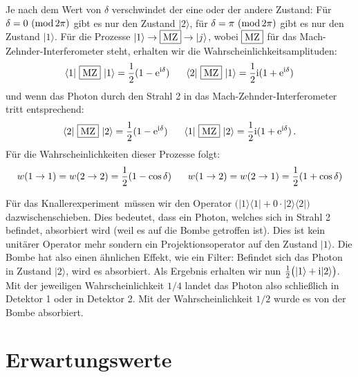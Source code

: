 Je nach dem Wert von $\delta$ verschwindet der eine oder der andere Zustand: F\"ur $\delta=0~({\rm mod}\, 2\pi)$ 
gibt es nur den Zustand $|2\rangle$, f\"ur $\delta = \pi~ ({\rm mod}\,2\pi)$ gibt es nur den Zustand $|1\rangle$. 
F\"ur die Prozesse $|1\rangle \rightarrow \fbox{MZ} \rightarrow |j\rangle$, wobei $\fbox{MZ}$ f\"ur das
Mach-Zehnder-Interferometer steht, erhalten wir die Wahrscheinlichkeitsamplituden:
\begin{equation}
   \langle 1 | ~ \fbox{MZ} ~ |  1\rangle  = \frac{1}{2} (1-{\rm e}^{{\rm i}\delta}) \hspace{0.6cm}
   \langle 2 | ~ \fbox{MZ} ~ |  1\rangle = \frac{1}{2} {\rm i} (1+{\rm e}^{{\rm i}\delta})   
\end{equation}
und wenn das Photon durch den Strahl 2 in das Mach-Zehnder-Interferometer tritt entsprechend:
\begin{equation}
   \langle 2 | ~ \fbox{MZ} ~ |  2\rangle  = \frac{1}{2} (1-{\rm e}^{{\rm i}\delta}) \hspace{0.6cm}
   \langle 1 | ~ \fbox{MZ} ~ |  2\rangle = \frac{1}{2} {\rm i} (1+{\rm e}^{{\rm i}\delta})   \, .
\end{equation}
F\"ur die Wahrscheinlichkeiten dieser Prozesse folgt: 
\begin{equation}
    w(1\rightarrow 1)  = w(2\rightarrow 2) = \frac{1}{2} (1-\cos \delta) \hspace{0.6cm}
    w(1 \rightarrow 2) = w(2\rightarrow 1) = \frac{1}{2} (1+\cos\delta)   
\end{equation}


F\"ur das \glqq Knallerexperiment\grqq\ m\"ussen 
wir den Operator $\big(|1\rangle \langle 1| + 0\cdot |2\rangle \langle 2| \big)$
dazwischenschieben. Dies bedeutet, dass ein Photon, welches sich in Strahl 2 befindet, absorbiert wird
(weil es auf die Bombe getroffen ist). Dies ist kein unit\"arer Operator mehr sondern ein Projektionsoperator auf
den Zustand $|1\rangle$. Die Bombe hat also einen \"ahnlichen Effekt, wie ein Filter: Befindet sich das Photon
in Zustand $|2\rangle$, wird es absorbiert. Als Ergebnis erhalten wir nun $\frac{1}{2} \big( |1\rangle + {\rm i} |2\rangle \big)$. 
Mit der jeweiligen Wahrscheinlichkeit $1/4$ landet das Photon also schlie\ss lich in Detektor 1 oder in Detektor 2. Mit
der Wahrscheinlichkeit $1/2$ wurde es von der Bombe absorbiert.  

\section{Erwartungswerte}

